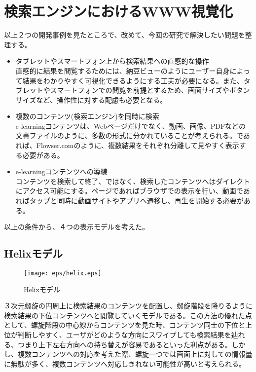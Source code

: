 \section{検索エンジンにおけるWWW視覚化}
以上２つの開発事例を見たところで、改めて、今回の研究で解決したい問題を整理する。
\begin{itemize}
\item タブレットやスマートフォン上から検索結果への直感的な操作
\\
直感的に結果を閲覧するためには、納豆ビューのようにユーザー自身によって結果をわかりやすく可視化できるようにする工夫が必要になる。また、タブレットやスマートフォンでの閲覧を前提とするため、画面サイズやボタンサイズなど、操作性に対する配慮も必要となる。
\\
\item 複数のコンテンツ(検索エンジン)を同時に検索
\\
e-learningコンテンツは、Webページだけでなく、動画、画像、PDFなどの文書ファイルのように、多数の形式に分かれていることが考えられる。であれば、Flowser.comのように、複数結果をそれぞれ分離して見やすく表示する必要がある。
\\
\item e-learningコンテンツへの導線
\\
コンテンツを検索して終了、ではなく、検索したコンテンツへはダイレクトにアクセス可能にする。ページであればブラウザでの表示を行い、動画であればタップと同時に動画サイトやアプリへ遷移し、再生を開始する必要がある。
\end{itemize}

以上の条件から、４つの表示モデルを考えた。

\subsection{Helixモデル}
\begin{figure}[htbp]
\begin{center}
\texttt{[image: eps/helix.eps]}
\caption{Helixモデル}
\label{helix}
\end{center}
\end{figure}
３次元螺旋の円周上に検索結果のコンテンツを配置し、螺旋階段を降りるように検索結果の下位コンテンツへと閲覧していくモデルである。この方法の優れた点として、螺旋階段の中心線からコンテンツを見た時、コンテンツ同士の下位と上位が判断しやすく、ユーザがどのような方向にスワイプしても検索結果を辿れる、つまり上下左右方向への持ち替えが容易であるといった利点がある。しかし、複数コンテンツへの対応を考えた際、螺旋一つでは画面上に対しての情報量に無駄が多く、複数コンテンツへ対応しきれない可能性が高いと考えられる。

